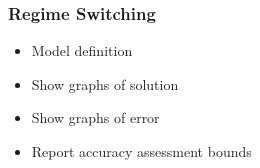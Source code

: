 \documentclass[letter]{beamer}
\begin{document}
\begin{frame}
  \frametitle{Regime Switching }
  \begin{itemize}
  \item Model definition
  \item Show graphs of solution
  \item Show graphs of error
  \item Report accuracy assessment bounds
  \end{itemize}
      
    \end{frame}



\end{document}
